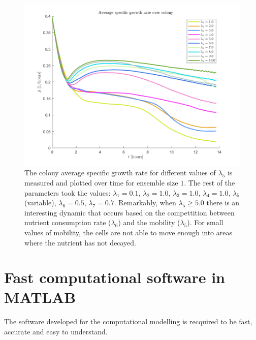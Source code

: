 \begin{figure}[!htb] %
    \centering
    \includegraphics[width= 1\textwidth]{
        chapter2/figures/SpecificGrowthRatePlot.png}
    \caption{The colony average specific growth rate for different values of $\lambda_5$
                is measured and plotted over time for ensemble size $1$. The rest of the parameters 
                took the values:
                $\lambda_1 = 0.1$,  
                $\lambda_2 = 1.0$, 
                $\lambda_3 = 1.0$, 
                $\lambda_4 = 1.0$, 
                $\lambda_5$ (variable), 
                $\lambda_6 = 0.5$, 
                $\lambda_7 = 0.7$.
                Remarkably, when $\lambda_5 \geq 5.0$ there is an interesting dynamic that 
                occurs based on the compettition between nutrient consumption rate ($\lambda_6$)
                and the mobility ($\lambda_5$). For small values of mobility,
                the cells are not able to move enough into areas where the nutrient has not 
                decayed.}
    \label{fig:ColonySimulationNutrientFieldN210}
    \end{figure}










\section{ Fast computational software in MATLAB }
The software developed for the computational modelling is recquired
to be fast, accurate and easy to understand.






    







